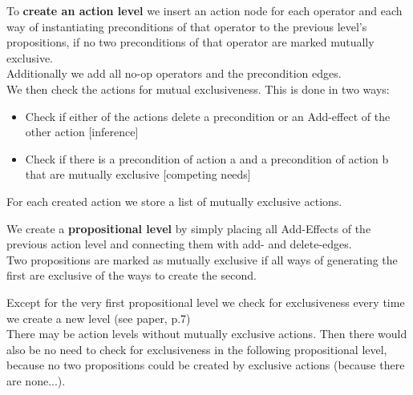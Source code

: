 \documentclass[paper=a4, fontsize=11pt]{scrartcl} %
\numberwithin{equation}{section} %
\numberwithin{figure}{section} %
\numberwithin{table}{section} %
\begin{document}
To \textbf{create an action level} we insert an action node for each operator and each way of instantiating preconditions of that operator to the previous level's propositions, if no two preconditions of that operator are marked mutually exclusive.\\
Additionally we add all no-op operators and the precondition edges.\\ 
We then check the actions for mutual exclusiveness. This is done in two ways:
\begin{itemize}
	\item Check if either of the actions delete a precondition or an Add-effect of the other action [inference]
	\item Check if there is a precondition of action a and a precondition of action b that are mutually exclusive [competing needs]
\end{itemize}
For each created action we store a list of mutually exclusive actions.\vspace{5mm}

We create a \textbf{propositional level} by simply placing all Add-Effects of the previous action level and connecting them with add- and delete-edges.\\
Two propositions are marked as mutually exclusive if all ways of generating the first are exclusive of the ways to create the second.\vspace{5mm}

Except for the very first propositional level we check for exclusiveness every time we create a new level (see paper, p.7)\\
There may be action levels without mutually exclusive actions. Then there would also be no need to check for exclusiveness in the following propositional level, because no two propositions could be created by exclusive actions (because there are none...).
\end{document}
